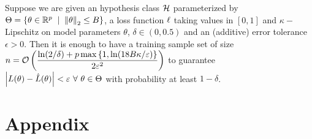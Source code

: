 \begin{cor}
Suppose we are given an hypothesis class ${\mathcal{H}}$ parameterized by $\Theta=\set{\theta \in\R^{p}\st \norm \theta2\le B}$, a loss function $\ell$ taking values in $[0,1]$ and $\kappa-$Lipschitz on model parameters $\theta$, $\delta\in(0,0.5)$ and an (additive) error tolerance $\epsilon>0$. Then it is enough to have a training sample set of size $\displaystyle n = {\mathcal{O}}\left(\frac{\ln(2/\delta) + p \max\left\{1,\ln(18B\kappa/\varepsilon)\right\}}{2\varepsilon^{2}}\right)$ to guarantee $\left| L(\theta)-\hat L(\theta) \right| < \varepsilon~\forall~ \theta\in \Theta$ with probability at least $1 - \delta$.
\end{cor}

\newpage
\appendix
\section{Appendix}
\renewcommand{\thesection}{\Alph{section}}
